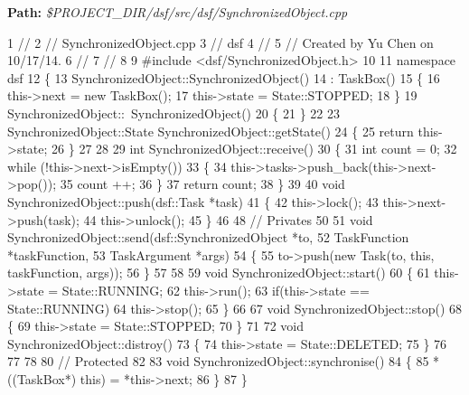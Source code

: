 {\bfseries Path\+:} {\itshape \$\+P\+R\+O\+J\+E\+C\+T\+\_\+\+D\+I\+R/dsf/src/dsf/\+Synchronized\+Object.cpp} 
\begin{DoxyCodeInclude}
1 \textcolor{comment}{//}
2 \textcolor{comment}{//  SynchronizedObject.cpp}
3 \textcolor{comment}{//  dsf}
4 \textcolor{comment}{//}
5 \textcolor{comment}{//  Created by Yu Chen on 10/17/14.}
6 \textcolor{comment}{//}
7 \textcolor{comment}{//}
8 
9 \textcolor{preprocessor}{#include <dsf/SynchronizedObject.h>}
10 
11 \textcolor{keyword}{namespace }dsf
12 \{
13     SynchronizedObject::SynchronizedObject()
14         : TaskBox()
15     \{
16         this->next = \textcolor{keyword}{new} TaskBox();
17         this->state = State::STOPPED;
18     \}
19     SynchronizedObject::~SynchronizedObject()
20     \{
21     \}
22     
23     SynchronizedObject::State SynchronizedObject::getState()
24     \{
25         \textcolor{keywordflow}{return} this->state;
26     \}
27 
28     
29     \textcolor{keywordtype}{int} SynchronizedObject::receive()
30     \{
31         \textcolor{keywordtype}{int} count = 0;
32         \textcolor{keywordflow}{while} (!this->next->isEmpty())
33         \{
34             this->tasks->push\_back(this->next->pop());
35             count ++;
36         \}
37         \textcolor{keywordflow}{return} count;
38     \}
39     
40     \textcolor{keywordtype}{void} SynchronizedObject::push(dsf::Task *task)
41     \{
42         this->lock();
43         this->next->push(task);
44         this->unlock();
45     \}
46     
48     \textcolor{comment}{// Privates}
50 \textcolor{comment}{}    
51     \textcolor{keywordtype}{void} SynchronizedObject::send(dsf::SynchronizedObject *to,
52                                 TaskFunction *taskFunction,
53                                 TaskArgument *args)
54     \{
55         to->push(\textcolor{keyword}{new} Task(to, \textcolor{keyword}{this}, taskFunction, args));
56     \}
57     
58     
59     \textcolor{keywordtype}{void} SynchronizedObject::start()
60     \{
61         this->state = State::RUNNING;
62         this->run();
63         \textcolor{keywordflow}{if}(this->state == State::RUNNING)
64             this->stop();
65     \}
66     
67     \textcolor{keywordtype}{void} SynchronizedObject::stop()
68     \{
69         this->state = State::STOPPED;
70     \}
71     
72     \textcolor{keywordtype}{void} SynchronizedObject::distroy()
73     \{
74         this->state = State::DELETED;
75     \}
76     
77     
78     
80     \textcolor{comment}{// Protected}
82 \textcolor{comment}{}    
83     \textcolor{keywordtype}{void} SynchronizedObject::synchronise()
84     \{
85         *((TaskBox*) \textcolor{keyword}{this}) = *this->next;
86     \}
87 \}
\end{DoxyCodeInclude}
